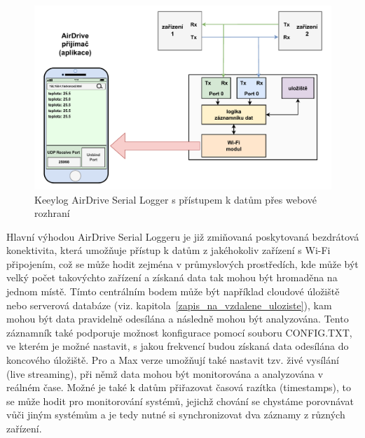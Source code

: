 \begin{figure}[h]
    \centering
    \includegraphics[width=1.00\textwidth]{obrazky-figures/keeylog_airdrive_serial_logger-cz.pdf}
    
    \caption{Keeylog AirDrive Serial Logger s přístupem k datům přes webové rozhraní \cite{keelog_airdrive_serial_datalogger, keelog_airdrive_serial_datalogger_scheme}}
    \label{fig:keelog-airdrive-serial-datalogger}
\end{figure}

Hlavní výhodou AirDrive Serial Loggeru je již zmiňovaná poskytovaná bezdrátová konektivita, která umožňuje přístup k datům z jakéhokoliv zařízení s Wi-Fi připojením, což se může hodit zejména v průmyslových  prostředích, kde může být velký počet takovýchto zařízení a získaná data tak mohou být hromaděna na jednom místě. Tímto centrálním bodem může být například cloudové úložiště nebo serverová databáze (viz. kapitola~\ref{zapis_na_vzdalene_uloziste}), kam mohou být data pravidelně odesílána a následně mohou být analyzována. Tento záznamník také podporuje možnost konfigurace pomocí souboru CONFIG.TXT, ve kterém je možné nastavit, s jakou frekvencí budou získaná data odesílána do koncového úložiště. Pro a Max verze umožňují také nastavit tzv. živé vysílání (live streaming), při němž data mohou být monitorována a analyzována v reálném čase. Možné je také k datům přiřazovat časová razítka (timestamps), to se může hodit pro monitorování systémů, jejichž chování se chystáme porovnávat vůči jiným systémům a je tedy nutné si synchronizovat dva záznamy z různých zařízení. \cite{keelog_airdrive_serial_datalogger}

